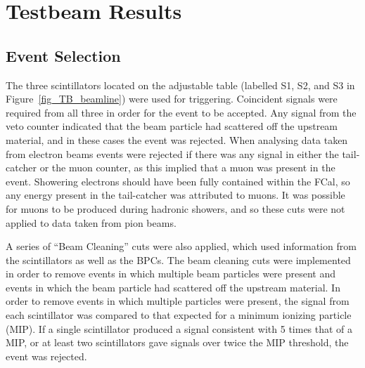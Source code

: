 \chapter{Testbeam Results}
\label{chap_TB_results}





%



\section{Event Selection}
\label{sec_event_selection}
The three scintillators located on the adjustable table (labelled S1, S2, and S3 in Figure~\ref{fig_TB_beamline}) were used for triggering. Coincident signals were required from all three in order for the event to be accepted. Any signal from the veto counter indicated that the beam particle had scattered off the upstream material, and in these cases the event was rejected. When analysing data taken from electron beams events were rejected if there was any signal in either the tail-catcher or the muon counter, as this implied that a muon was present in the event. Showering electrons should have been fully contained within the FCal, so any energy present in the tail-catcher was attributed to muons. It was possible for muons to be produced during hadronic showers, and so these cuts were not applied to data taken from pion beams. 

A series of ``Beam Cleaning'' cuts were also applied, which used information from the scintillators as well as the BPCs. The beam cleaning cuts were implemented in order to remove events in which  multiple beam particles were present and events in which the beam particle had scattered off the upstream material. In order to remove events in which multiple particles were present, the signal from each scintillator was compared to that expected for a minimum ionizing particle (MIP). If a single scintillator produced a signal consistent with 5 times that of a MIP, or at least two scintillators gave signals over twice the MIP threshold, the event was rejected. 

